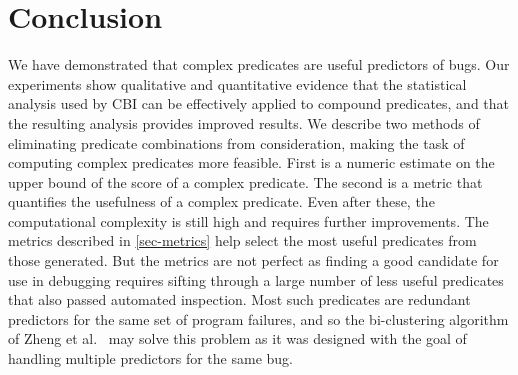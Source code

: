 
\section{Conclusion}
\label{sec-conc}
We have demonstrated that complex predicates are useful predictors of bugs.  
Our experiments show qualitative and quantitative evidence that the statistical 
analysis used by CBI can be effectively applied to compound predicates, and that
the resulting analysis provides improved results.  We describe
two methods of eliminating predicate combinations from consideration, making
the task of computing complex predicates more feasible.  First is a numeric 
estimate on the upper bound of the score of a complex predicate.  The second is 
a metric that quantifies the usefulness of a complex predicate.  Even after these, 
the computational complexity is still high and requires further improvements.  
The metrics described in \autoref{sec-metrics} help select the most useful predicates
from those generated.  But the metrics are not perfect as finding a good candidate
for use in debugging requires sifting through a large number of less useful predicates
that also passed automated inspection.  Most such predicates are redundant predictors
for the same set of program failures, and so the bi-clustering algorithm of Zheng et al.\ 
\cite{Zheng:2006:SDSIMB} may solve this problem as it was designed with the goal 
of handling multiple predictors for the same bug.
